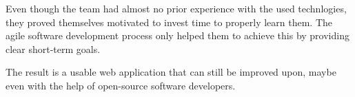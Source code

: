 \documentclass[bibliography=totoc, listof=totocnumbered]{scrartcl}
\begin{document}
Even though the team had almost no prior experience with the used technlogies,
they proved themselves motivated to invest time to properly learn them. The
agile software development process only helped them to achieve this by providing
clear short-term goals.

The result is a usable web application that can still be improved upon, maybe
even with the help of open-source software developers.

\clearpage
\printbibliography
\end{document}
